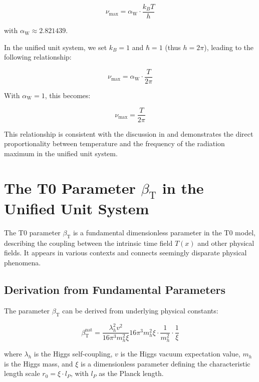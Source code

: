 \documentclass[12pt,a4paper]{article}
\newcommand{\Tfield}{T(x)}
\newcommand{\betaT}{\beta_{\text{T}}}
\newcommand{\alphaW}{\alpha_{\text{W}}}
\begin{document}
	\begin{equation}
		\label{eq:wien_law}
		\nu_{\text{max}} = \alphaW \cdot \frac{k_B T}{h}
	\end{equation}
	
	with \(\alphaW \approx 2.821439\).
	
	In the unified unit system, we set \(k_B = 1\) and \(\hbar = 1\) (thus \(h = 2\pi\)), leading to the following relationship:
	
	\begin{equation}
		\nu_{\text{max}} = \alphaW \cdot \frac{T}{2\pi}
	\end{equation}
	
	With \(\alphaW = 1\), this becomes:
	
	\begin{equation}
		\nu_{\text{max}} = \frac{T}{2\pi}
	\end{equation}
	
	This relationship is consistent with the discussion in \cite{pascher_temp_2025} and demonstrates the direct proportionality between temperature and the frequency of the radiation maximum in the unified unit system.
	
	\section{The T0 Parameter \(\betaT\) in the Unified Unit System}
	\label{sec:beta_t}
	
	The T0 parameter \(\betaT\) is a fundamental dimensionless parameter in the T0 model, describing the coupling between the intrinsic time field \(\Tfield\) and other physical fields. It appears in various contexts and connects seemingly disparate physical phenomena.
	
	\subsection{Derivation from Fundamental Parameters}
	\label{subsec:beta_derivation}
	
	The parameter \(\betaT\) can be derived from underlying physical constants:
	
	\begin{equation}
		\label{eq:beta_fundamental}
		\betaT^{\text{nat}} = \frac{\lambda_h^2 v^2}{16\pi^3 m_h^2 \xi}{16\pi^3 m_h^2 \xi} \cdot \frac{1}{m_h^2} \cdot \frac{1}{\xi}
	\end{equation}
	
	where \(\lambda_h\) is the Higgs self-coupling, \(v\) is the Higgs vacuum expectation value, \(m_h\) is the Higgs mass, and \(\xi\) is a dimensionless parameter defining the characteristic length scale \(r_0 = \xi \cdot l_P\), with \(l_P\) as the Planck length.
	
\end{document}
